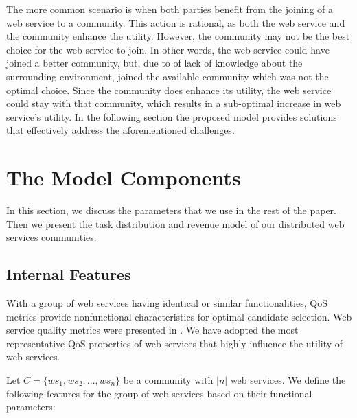 \documentclass[10pt,journal,cspaper,compsoc]{IEEEtran}
\begin{document}
The more common scenario is when both parties benefit from the joining of a web service to a community. This action is rational, as both the web service and the community enhance the utility. However, the community may not be the best choice for the web service to join. In other words, the web service could have joined a better community, but, due to of lack of knowledge about the surrounding environment, joined the available community which was not the optimal choice. Since the community does enhance its utility, the web service could stay with that community, which results in a sub-optimal increase in web service's utility. In the following section the proposed model provides solutions that effectively address the aforementioned challenges.

\section{The Model Components}\label{s:themodelcomponents}

In this section, we discuss the parameters that we use in the rest of the paper. Then we present the task distribution and revenue model of our distributed web services communities.

\subsection{Internal Features}\label{s:if}

With a group of web services having identical or similar functionalities, QoS metrics provide nonfunctional characteristics for optimal candidate selection. Web service quality metrics were presented in \cite{Ardagna:2007:ASC:1263152.1263531,Menasce:2002:QIW:613357.613758,10.1109/ISSRE.2011.17}. We have adopted the most representative QoS properties of web services that highly influence the utility of web services. 

Let $C = \{ws_1,ws_2,..., ws_n\}$ be a community with $|n|$ web services. We define the following features for the group of web services based on their functional parameters:
\end{document}
